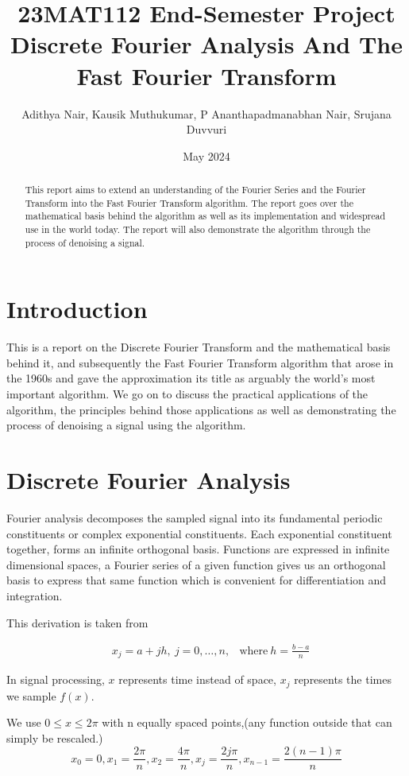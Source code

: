 \documentclass[11pt]{amsart}
\title{23MAT112 End-Semester Project \\ Discrete Fourier Analysis And The Fast Fourier Transform}
\author{Adithya Nair, Kausik Muthukumar, P Ananthapadmanabhan Nair, Srujana Duvvuri}
\date{May 2024}
\theoremstyle{definition}
\theoremstyle{remark}
\numberwithin{equation}{section}
\begin{document}
\begin{abstract}
	This report aims to extend an understanding of the Fourier Series and the Fourier Transform into the Fast Fourier Transform algorithm. The report goes over the mathematical basis behind the algorithm as well as its implementation and widespread use in the world today. The report will also demonstrate the algorithm through the process of denoising a signal.
\end{abstract}

\maketitle

\section{Introduction}\label{sec1}
 This is a report on the Discrete Fourier Transform and the mathematical basis behind it, and subsequently the Fast Fourier Transform algorithm that arose in the 1960s and gave the approximation its title as arguably the world's most important algorithm. We go on to discuss the practical applications of the algorithm, the principles behind those applications as well as demonstrating the process of denoising a signal using the algorithm.

\section{Discrete Fourier Analysis}
Fourier analysis decomposes the sampled signal into its fundamental periodic constituents or complex exponential constituents. Each exponential constituent together, forms an infinite orthogonal basis. Functions are expressed in infinite dimensional spaces, a Fourier series of a given function gives us an orthogonal basis to express that same function which is convenient for differentiation and integration.

This derivation is taken from \cite{Olver2015TopicsIF}


\begin{align*}
	&x_j = a + jh, \ j = 0, \dots, n, & \text{where} \ h = \frac{b-a}{n}
\end{align*}

In signal processing, $x$ represents time instead of space, $x_j$ represents the times we sample $f(x)$.

We use $0 \leq x \leq 2 \pi$ with n equally spaced points,(any function outside that can simply be rescaled.)
\[ 
	x_0 = 0, x_1 = \frac{2\pi}{n}, x_2 = \frac{4\pi}{n}, x_j = \frac{2j\pi}{n}, x_{n-1} = \frac{2(n-1)\pi}{n}
\]
\end{document}
